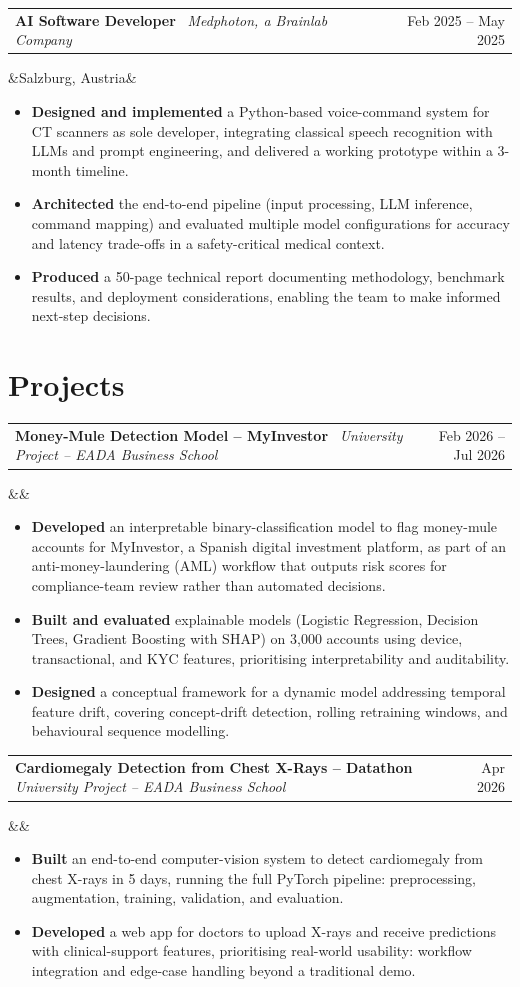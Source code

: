 \documentclass[10pt, a4paper]{article}
\makeatletter
\newcommand{\cventry}[5]{%
  \noindent
  \begin{tabularx}{\linewidth}{@{}X r@{}}
    {\bfseries #2} \, {\normalsize\textit{#3}} &
    {\small\color{mutedcolor}#1}
  \end{tabularx}%
  \ifx&#4&\else\par\noindent{\small\color{mutedcolor}\faMapMarker*\enspace #4}\fi
  \par #5\vspace{2pt}%
}
\newenvironment{cvlist}{%
  \begin{itemize}[leftmargin=1.2em, label=\textcolor{headcolor}{\small$\bullet$},
    itemsep=1pt, parsep=0pt, topsep=2pt]
}{\end{itemize}}
\makeatother
\begin{document}
\cventry{Feb 2025 -- May 2025}
  {AI Software Developer}
  {Medphoton, a Brainlab Company}
  {Salzburg, Austria}
  {%
    \begin{cvlist}
      \item \textbf{Designed and implemented} a Python-based voice-command system for CT scanners as sole developer, integrating classical speech recognition with LLMs and prompt engineering, and delivered a working prototype within a 3-month timeline.
      \item \textbf{Architected} the end-to-end pipeline (input processing, LLM inference, command mapping) and evaluated multiple model configurations for accuracy and latency trade-offs in a safety-critical medical context.
      \item \textbf{Produced} a 50-page technical report documenting methodology, benchmark results, and deployment considerations, enabling the team to make informed next-step decisions.
    \end{cvlist}
  }

\section{Projects}

\cventry{Feb 2026 -- Jul 2026}
  {Money-Mule Detection Model -- MyInvestor}
  {University Project -- EADA Business School}
  {}
  {%
    \begin{cvlist}
      \item \textbf{Developed} an interpretable binary-classification model to flag money-mule accounts for MyInvestor, a Spanish digital investment platform, as part of an anti-money-laundering (AML) workflow that outputs risk scores for compliance-team review rather than automated decisions.
      \item \textbf{Built and evaluated} explainable models (Logistic Regression, Decision Trees, Gradient Boosting with SHAP) on 3{,}000 accounts using device, transactional, and KYC features, prioritising interpretability and auditability.
      \item \textbf{Designed} a conceptual framework for a dynamic model addressing temporal feature drift, covering concept-drift detection, rolling retraining windows, and behavioural sequence modelling.
    \end{cvlist}
  }

\cventry{Apr 2026}
  {Cardiomegaly Detection from Chest X-Rays -- Datathon}
  {University Project -- EADA Business School}
  {}
  {%
    \begin{cvlist}
      \item \textbf{Built} an end-to-end computer-vision system to detect cardiomegaly from chest X-rays in 5 days, running the full PyTorch pipeline: preprocessing, augmentation, training, validation, and evaluation.
      \item \textbf{Developed} a web app for doctors to upload X-rays and receive predictions with clinical-support features, prioritising real-world usability: workflow integration and edge-case handling beyond a traditional demo.
    \end{cvlist}
  }
\end{document}

